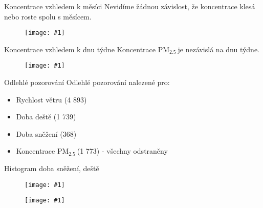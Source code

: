 \documentclass{beamer}%
\newcommand{\pmQuant}[0]{$\text{PM}_{2.5}\:$}
\newcommand{\image}[2]{\begin{figure}[ht!] \centering \texttt{[image: \#1]} \end{figure}}
\newenvironment{cols}{\begin{columns}}{\end{columns}}
\newenvironment{hcol}{\begin{column}{{0.5\linewidth}}}{\end{column}}
\begin{document}
\begin{frame}{Koncentrace vzhledem k měsíci}
    Nevidíme žádnou závislost, že koncentrace klesá nebo roste spolu s měsícem.
    \image{../target_by_month_day.pdf}{1.0}
\end{frame}
\begin{frame}{Koncentrace vzhledem k dnu týdne}
    Koncentrace \pmQuant je nezávislá na dnu týdne.
    \image{../target_by_week_day.pdf}{1.0}
\end{frame}
\begin{frame}{Odlehlé pozorování}
    Odlehlé pozorování nalezené pro:
    \begin{itemize}
        \item Rychlost větru (4 893) \footnotemark[1]
        \item Doba deště (1 739) \footnotemark[1]
        \item Doba sněžení (368) \footnotemark[1]
        \item Koncentrace \pmQuant (1 773) - všechny odstraněny
    \end{itemize}
    
\end{frame}
\begin{frame}{Histogram doba sněžení, deště}
    \image{../hrain.pdf}{0.65}
    \image{../hsnow.pdf}{0.65}
\end{frame}
\end{document}
